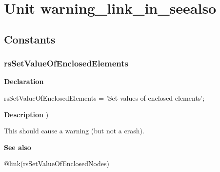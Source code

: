 \documentclass{report}
\newif\ifpdf
\begin{document}
\label{toc}\tableofcontents
\newpage
\newlength{\tmplength}
\chapter{Unit warning{\_}link{\_}in{\_}seealso}
\label{warning_link_in_seealso}
\section{Constants}
\ifpdf
\subsection*{\large{\textbf{rsSetValueOfEnclosedElements}}\normalsize\hspace{1ex}\hrulefill}
\else
\subsection*{rsSetValueOfEnclosedElements}
\fi
\label{warning_link_in_seealso-rsSetValueOfEnclosedElements}
\begin{list}{}{
\setlength{\itemindent}{0cm}
\setlength{\listparindent}{0cm}
\setlength{\leftmargin}{\evensidemargin}
\addtolength{\leftmargin}{\tmplength}
\settowidth{\labelsep}{X}
\addtolength{\leftmargin}{\labelsep}
\setlength{\labelwidth}{\tmplength}
}
\item[\textbf{Declaration}\hfill]
\ifpdf
\begin{flushleft}
\fi
\begin{ttfamily}
rsSetValueOfEnclosedElements = 'Set values of enclosed elements';\end{ttfamily}

\ifpdf
\end{flushleft}
\fi

\par
\item[\textbf{Description}]
)

This should cause a warning (but not a crash).\item[\textbf{See also}]
\begin{description}
\item[@link(rsSetValueOfEnclosedNodes)] 

\end{description}


\end{list}
\end{document}
